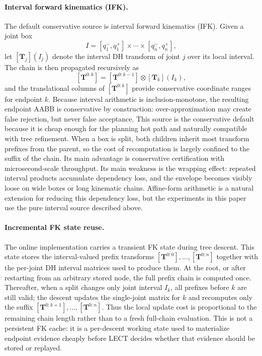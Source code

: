 \documentclass[journal]{IEEEtran}
\begin{document}
\paragraph{Interval forward kinematics (IFK).}
The default conservative source is interval forward kinematics (IFK). Given a joint box
\[
I = [q_1^-,q_1^+] \times \cdots \times [q_n^-,q_n^+],
\]
let $[\bm{T}_j](I_j)$ denote the interval DH transform of joint $j$ over its
local interval. The chain is then propagated recursively as
\[
[\bm{T}^{0:k}] = [\bm{T}^{0:k-1}] \otimes [\bm{T}_k](I_k),
\]
and the translational columns of $[\bm{T}^{0:k}]$ provide conservative
coordinate ranges for endpoint $k$. Because interval arithmetic is
inclusion-monotone, the resulting endpoint AABB is conservative by
construction: over-approximation may create false rejection, but never false
acceptance. This source is the conservative default because it is cheap enough for
the planning hot path and naturally compatible with tree refinement. When a box
is split, both children inherit most transform prefixes from the parent, so the
cost of recomputation is largely confined to the suffix of the chain. Its main
advantage is conservative certification with microsecond-scale throughput. Its main
weakness is the wrapping effect: repeated interval products accumulate
dependency loss, and the envelope becomes visibly loose on wide boxes or long
kinematic chains. Affine-form arithmetic is a natural extension for reducing
this dependency loss, but the experiments in this paper use the pure interval
source described above.

\paragraph{Incremental FK state reuse.}
The online implementation carries a transient FK state during tree descent. This
state stores the interval-valued prefix transforms
$[\bm{T}^{0:0}],\ldots,[\bm{T}^{0:n}]$ together with the per-joint DH interval
matrices used to produce them. At the root, or after restarting from an
arbitrary stored node, the full prefix chain is computed once. Thereafter, when
a split changes only joint interval $I_k$, all prefixes before $k$ are still
valid; the descent updates the single-joint matrix for $k$ and recomputes only
the suffix $[\bm{T}^{0:k+1}],\ldots,[\bm{T}^{0:n}]$. Thus the local update cost
is proportional to the remaining chain length rather than to a fresh full-chain
evaluation. This is not a persistent FK cache: it is a per-descent working state
used to materialize endpoint evidence cheaply before LECT decides whether that
evidence should be stored or replayed.
\end{document}
